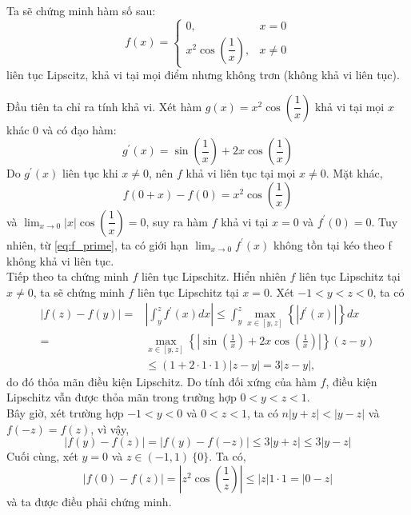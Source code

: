 \begin{vd} 
    Ta sẽ chứng minh hàm số sau: 
    \begin{equation}
    \label{eq:vd1.5}
    f(x) = 
        \begin{cases}
        0, &x = 0\\
        x^2\cos(\dfrac{1}{x}), &x \neq 0
        \end{cases}
    \end{equation}
    liên tục Lipscitz, khả vi tại mọi điểm nhưng không trơn (không khả vi liên tục).
    \begin{cm}
    Đầu tiên ta chỉ ra tính khả vi. Xét hàm $g(x) = x^2\cos(\dfrac{1}{x})$ khả vi tại mọi $x$ khác 0 và có đạo hàm:
    \begin{equation}
    \label{eq:f_prime}
        g^\prime(x) = \sin(\dfrac{1}{x}) + 2x\cos(\dfrac{1}{x})
    \end{equation}
    Do $g^\prime (x)$ liên tục khi $x \neq 0$, nên $f$ khả vi liên tục tại mọi $x \neq 0$. Mặt khác, 
\begin{equation}
    f(0+x) -f(0) = x^2\cos(\dfrac{1}{x})
\end{equation}
và $\lim_{x \to 0} |x| \cos(\dfrac{1}{x}) = 0$, suy ra hàm $f$ khả vi tại $x =0$ và $f^\prime(0) = 0$. Tuy nhiên, từ \eqref{eq:f_prime}, ta có giới hạn $\lim_{x \to 0} f^\prime(x)$ không tồn tại kéo theo f không khả vi liên tục.\\
\indent Tiếp theo ta chứng minh $f$ liên tục Lipschitz. Hiển nhiên $f$ liên tục Lipschitz tại $x \neq 0$, ta sẽ chứng minh $f$ liên tục Lipschitz tại $x=0$. Xét $-1 < y < z < 0$, ta có
\begin{align*}
|f(z)-f(y)|= & \left|\int_y^z f^{\prime}(x) d x\right| \leq \int_y^z \max _{x \in[y, z]}\left\{\left|f^{\prime}(x)\right|\right\} d x \\
= & \max _{x \in[y, z]}\left\{\left|\sin \left(\frac{1}{x}\right)+2 x \cos \left(\frac{1}{x}\right)\right|\right\}(z-y) \\
& \leq(1+2 \cdot 1 \cdot 1)|z-y|=3|z-y|,
\end{align*}
do đó thỏa mãn điều kiện Lipschitz. Do tính đối xứng của hàm $f$, điều kiện Lipschitz vẫn được thỏa mãn trong trường hợp $0 < y<z <1$.\\
\indent Bây giờ, xét trường hợp $-1 < y < 0 $ và $0 < z < 1$, ta có $n |y + z| < |y - z| $ và $f (-z) = f (z)$, vì vậy,
\begin{equation*}
     |f (y) - f (z)| = | f (y) - f (-z)| \leq 3 |y + z| \leq 3 |y - z|
\end{equation*}
\indent Cuối cùng, xét $y = 0$ và $z \in (-1, 1) \ \{0\}$. Ta có,
\begin{equation*}
    |f(0)-f(z)|=\left|z^2 \cos \left(\frac{1}{z}\right)\right| \leq|z| 1 \cdot 1=|0-z|
\end{equation*}
và ta được điều phải chứng minh.
\end{cm}
\end{vd}
